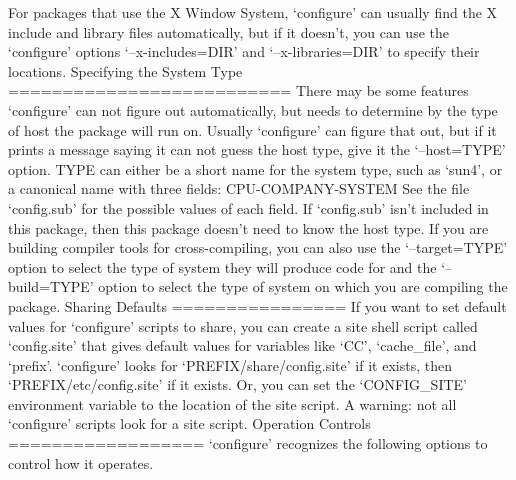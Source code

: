\begin{DoxyCodeInclude}
   For packages that use the X Window System, `configure\textcolor{stringliteral}{' can usually}
\textcolor{stringliteral}{find the X include and library files automatically, but if it doesn'}t,
you can use the `configure\textcolor{stringliteral}{' options `--x-includes=DIR'} and
`--x-libraries=DIR\textcolor{stringliteral}{' to specify their locations.}
\textcolor{stringliteral}{}
\textcolor{stringliteral}{Specifying the System Type}
\textcolor{stringliteral}{==========================}
\textcolor{stringliteral}{}
\textcolor{stringliteral}{   There may be some features `configure'} can not figure out
automatically, but needs to determine by the type of host the package
will run on.  Usually `configure\textcolor{stringliteral}{' can figure that out, but if it prints}
\textcolor{stringliteral}{a message saying it can not guess the host type, give it the}
\textcolor{stringliteral}{`--host=TYPE'} option.  TYPE can either be a \textcolor{keywordtype}{short} name \textcolor{keywordflow}{for} the system
type, such as `sun4\textcolor{stringliteral}{', or a canonical name with three fields:}
\textcolor{stringliteral}{     CPU-COMPANY-SYSTEM}
\textcolor{stringliteral}{}
\textcolor{stringliteral}{See the file `config.sub'} \textcolor{keywordflow}{for} the possible values of each field.  If
`config.sub\textcolor{stringliteral}{' isn'}t included in \textcolor{keyword}{this} package, then \textcolor{keyword}{this} package doesn\textcolor{stringliteral}{'t}
\textcolor{stringliteral}{need to know the host type.}
\textcolor{stringliteral}{}
\textcolor{stringliteral}{   If you are building compiler tools for cross-compiling, you can also}
\textcolor{stringliteral}{use the `--target=TYPE'} option to select the type of system they will
produce code \textcolor{keywordflow}{for} and the `--build=TYPE\textcolor{stringliteral}{' option to select the type of}
\textcolor{stringliteral}{system on which you are compiling the package.}
\textcolor{stringliteral}{}
\textcolor{stringliteral}{Sharing Defaults}
\textcolor{stringliteral}{================}
\textcolor{stringliteral}{}
\textcolor{stringliteral}{   If you want to set default values for `configure'} scripts to share,
you can create a site shell script called `config.site\textcolor{stringliteral}{' that gives}
\textcolor{stringliteral}{default values for variables like `CC'}, `cache\_file\textcolor{stringliteral}{', and `prefix'}.
`configure\textcolor{stringliteral}{' looks for `PREFIX/share/config.site'} \textcolor{keywordflow}{if} it exists, then
`PREFIX/etc/config.site\textcolor{stringliteral}{' if it exists.  Or, you can set the}
\textcolor{stringliteral}{`CONFIG\_SITE'} environment variable to the location of the site script.
A warning: not all `configure\textcolor{stringliteral}{' scripts look for a site script.}
\textcolor{stringliteral}{}
\textcolor{stringliteral}{Operation Controls}
\textcolor{stringliteral}{==================}
\textcolor{stringliteral}{}
\textcolor{stringliteral}{   `configure'} recognizes the following options to control how it
operates.


\end{DoxyCodeInclude}
